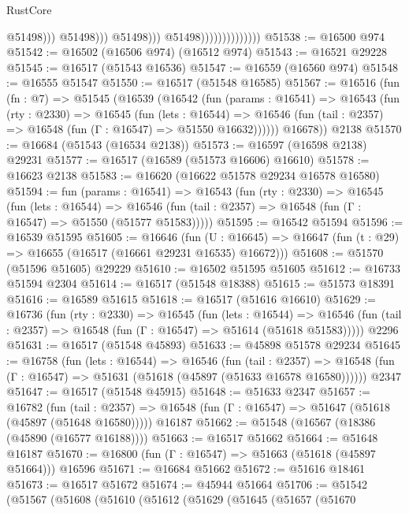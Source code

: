\begin{lexlean}{RustCore}
\begin{coremodule}
                                                  @51498)))
                                            @51498)))
                                      @51498)))
                                @51498))))))))))))))
@51538 := @16500 @974
@51542 := @16502 (@16506 @974) (@16512 @974)
@51543 := @16521 @29228
@51545 := @16517 (@51543 @16536)
@51547 := @16559 (@16560 @974)
@51548 := @16555 @51547
@51550 := @16517 (@51548 @16585)
@51567 := @16516
    (fun (fn : @7) =>
    @51545
      (@16539
        (@16542
          (fun (params : @16541) =>
          @16543
            (fun (rty : @2330) =>
            @16545
              (fun (lets : @16544) =>
              @16546 (fun (tail : @2357) => @16548 (fun (Γ : @16547) => @51550 @16632))))))
        @16678))
    @2138
@51570 := @16684 (@51543 (@16534 @2138))
@51573 := @16597 (@16598 @2138) @29231
@51577 := @16517 (@16589 (@51573 @16606) @16610)
@51578 := @16623 @2138
@51583 := @16620 (@16622 @51578 @29234 @16578 @16580)
@51594 := fun (params : @16541) =>
  @16543
    (fun (rty : @2330) =>
    @16545
      (fun (lets : @16544) =>
      @16546 (fun (tail : @2357) => @16548 (fun (Γ : @16547) => @51550 (@51577 @51583)))))
@51595 := @16542 @51594
@51596 := @16539 @51595
@51605 := @16646
    (fun (U : @16645) => @16647 (fun (t : @29) => @16655 (@16517 (@16661 @29231 @16535) @16672)))
@51608 := @51570 (@51596 @51605) @29229
@51610 := @16502 @51595 @51605
@51612 := @16733 @51594 @2304
@51614 := @16517 (@51548 @18388)
@51615 := @51573 @18391
@51616 := @16589 @51615
@51618 := @16517 (@51616 @16610)
@51629 := @16736
    (fun (rty : @2330) =>
    @16545
      (fun (lets : @16544) =>
      @16546 (fun (tail : @2357) => @16548 (fun (Γ : @16547) => @51614 (@51618 @51583)))))
    @2296
@51631 := @16517 (@51548 @45893)
@51633 := @45898 @51578 @29234
@51645 := @16758
    (fun (lets : @16544) =>
    @16546
      (fun (tail : @2357) =>
      @16548 (fun (Γ : @16547) => @51631 (@51618 (@45897 (@51633 @16578 @16580))))))
    @2347
@51647 := @16517 (@51548 @45915)
@51648 := @51633 @2347
@51657 := @16782
    (fun (tail : @2357) => @16548 (fun (Γ : @16547) => @51647 (@51618 (@45897 (@51648 @16580)))))
    @16187
@51662 := @51548 (@16567 (@18386 (@45890 (@16577 @16188))))
@51663 := @16517 @51662
@51664 := @51648 @16187
@51670 := @16800 (fun (Γ : @16547) => @51663 (@51618 (@45897 @51664))) @16596
@51671 := @16684 @51662
@51672 := @51616 @18461
@51673 := @16517 @51672
@51674 := @45944 @51664
@51706 := @51542
    (@51567
      (@51608
        (@51610
          (@51612
            (@51629
              (@51645
                (@51657
                  (@51670

\end{coremodule}
\end{lexlean}
